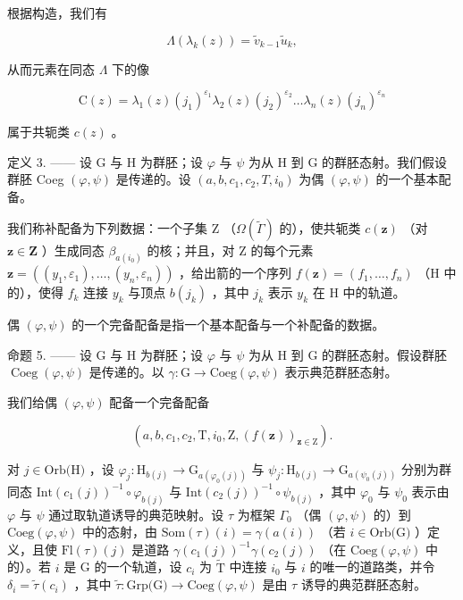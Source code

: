 根据构造，我们有

\[
\Lambda (\lambda_ {k} (z)) = \widetilde {v} _ {k - 1} \widetilde {u} _ {k},
\]

从而元素在同态 \(\Lambda\) 下的像

\[
\mathrm{C} (z) = \lambda_ {1} (z) (j _ {1}) ^ {\varepsilon_ {1}} \lambda_ {2} (z) (j _ {2}) ^ {\varepsilon_ {2}} \dots \lambda_ {n} (z) (j _ {n}) ^ {\varepsilon_ {n}}\tag{2}
\]

属于共轭类 \(c(z)\) 。

定义 3. —— 设 G 与 H 为群胚；设 \(\varphi\) 与 \(\psi\) 为从 H 到 G 的群胚态射。我们假设群胚 Coeg \((\varphi, \psi)\) 是传递的。设 \((a, b, c_1, c_2, T, i_0)\) 为偶 \((\varphi, \psi)\) 的一个基本配备。

我们称补配备为下列数据：一个子集 Z （\(\Omega(\widetilde{\Gamma})\) 的），使共轭类 \(c(\mathbf{z})\) （对 \(\mathbf{z} \in \mathbf{Z}\) ）生成同态 \(\beta_{a(i_0)}\) 的核；并且，对 Z 的每个元素 \(\mathbf{z} = ((y_1, \varepsilon_1), \ldots, (y_n, \varepsilon_n))\) ，给出箭的一个序列 \(f(\mathbf{z}) = (f_1, \ldots, f_n)\) （H 中的），使得 \(f_k\) 连接 \(y_k\) 与顶点 \(b(j_k)\) ，其中 \(j_k\) 表示 \(y_k\) 在 H 中的轨道。

偶 \((\varphi,\psi)\) 的一个完备配备是指一个基本配备与一个补配备的数据。

命题 5. —— 设 G 与 H 为群胚；设 \(\varphi\) 与 \(\psi\) 为从 H 到 G 的群胚态射。假设群胚 \(\operatorname{Coeg}(\varphi, \psi)\) 是传递的。以 \(\gamma\colon \mathrm{G} \to \mathrm{Coeg}(\varphi, \psi)\) 表示典范群胚态射。

我们给偶 \((\varphi, \psi)\) 配备一个完备配备

\[
(a, b, c _ {1}, c _ {2}, \mathrm{T}, i _ {0}, \mathrm{Z}, (f (\mathbf {z})) _ {\mathbf {z} \in \mathrm{Z}}).
\]

对 \(j \in \text{Orb(H)}\) ，设 \(\varphi_j \colon \text{H}_{b(j)} \to \text{G}_{a(\varphi_0(j))}\) 与 \(\psi_j \colon \text{H}_{b(j)} \to \text{G}_{a(\psi_0(j))}\) 分别为群同态 \(\text{Int}(c_1(j))^{-1} \circ \varphi_{b(j)}\) 与 \(\text{Int}(c_2(j))^{-1} \circ \psi_{b(j)}\) ，其中 \(\varphi_0\) 与 \(\psi_0\) 表示由 \(\varphi\) 与 \(\psi\) 通过取轨道诱导的典范映射。设 \(\tau\) 为框架 \(\Gamma_0\) （偶 \((\varphi, \psi)\) 的）到 \(\text{Coeg}(\varphi, \psi)\) 中的态射，由 \(\text{Som}(\tau)(i) = \gamma(a(i))\) （若 \(i \in \text{Orb(G)}\) ）定义，且使 \(\text{Fl}(\tau)(j)\) 是道路 \(\gamma(c_1(j))^{-1} \gamma(c_2(j))\) （在 \(\text{Coeg}(\varphi, \psi)\) 中的）。若 \(i\) 是 G 的一个轨道，设 \(c_i\) 为 \(\widetilde{\text{T}}\) 中连接 \(i_0\) 与 \(i\) 的唯一的道路类，并令 \(\delta_i = \widetilde{\tau}(c_i)\) ，其中 \(\widetilde{\tau} \colon \text{Grp(G)} \to \text{Coeg}(\varphi, \psi)\) 是由 \(\tau\) 诱导的典范群胚态射。

